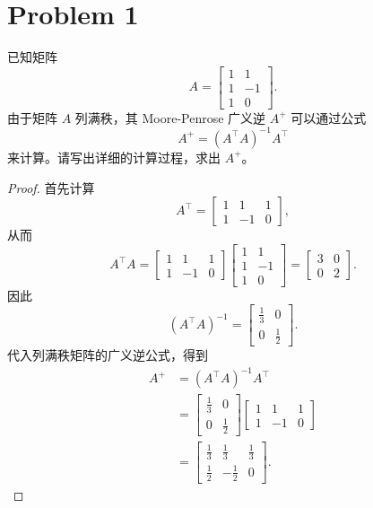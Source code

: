\section*{Problem 1}

已知矩阵
\[
    A = \begin{bmatrix}
        1 & 1 \\
        1 & -1 \\
        1 & 0
    \end{bmatrix}.
\]
由于矩阵 $A$ 列满秩，其 Moore-Penrose 广义逆 $A^+$ 可以通过公式
\[
    A^+ = \left(A^\top A\right)^{-1}A^\top
\]
来计算。请写出详细的计算过程，求出 $A^+$。

\begin{proof}
    首先计算
    \[
        A^\top
        = \begin{bmatrix}
            1 & 1 & 1 \\
            1 & -1 & 0
        \end{bmatrix},
    \]
    从而
    \[
        A^\top A
        = \begin{bmatrix}
            1 & 1 & 1 \\
            1 & -1 & 0
        \end{bmatrix}
        \begin{bmatrix}
            1 & 1 \\
            1 & -1 \\
            1 & 0
        \end{bmatrix}
        = \begin{bmatrix}
            3 & 0 \\
            0 & 2
        \end{bmatrix}.
    \]
    因此
    \[
        \left(A^\top A\right)^{-1}
        = \begin{bmatrix}
            \frac{1}{3} & 0 \\
            0 & \frac{1}{2}
        \end{bmatrix}.
    \]
    代入列满秩矩阵的广义逆公式，得到
    \[
        \begin{aligned}
            A^+
            &= \left(A^\top A\right)^{-1}A^\top \\
            &= \begin{bmatrix}
                \frac{1}{3} & 0 \\
                0 & \frac{1}{2}
            \end{bmatrix}
            \begin{bmatrix}
                1 & 1 & 1 \\
                1 & -1 & 0
            \end{bmatrix} \\
            &= \boxed{\begin{bmatrix}
                \frac{1}{3} & \frac{1}{3} & \frac{1}{3} \\
                \frac{1}{2} & -\frac{1}{2} & 0
            \end{bmatrix}}.
        \end{aligned}
    \]
\end{proof}

